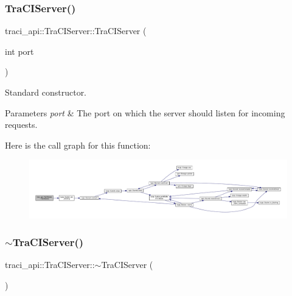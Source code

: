 \subsubsection{\texorpdfstring{Tra\+C\+I\+Server()}{TraCIServer()}}
{\footnotesize\ttfamily traci\+\_\+api\+::\+Tra\+C\+I\+Server\+::\+Tra\+C\+I\+Server (\begin{DoxyParamCaption}\item[{int}]{port }\end{DoxyParamCaption})}



Standard constructor. 


\begin{DoxyParams}{Parameters}
{\em port} & The port on which the server should listen for incoming requests. \\
\hline
\end{DoxyParams}
Here is the call graph for this function\+:\nopagebreak
\begin{figure}[H]
\begin{center}
\leavevmode
\includegraphics[width=350pt]{classtraci__api_1_1_tra_c_i_server_a9960233a10a2c3790c375f91eec00b12_cgraph}
\end{center}
\end{figure}
\mbox{\label{classtraci__api_1_1_tra_c_i_server_a8ddc7d9ea6812c937cdaa06a00026eba}} 
\subsubsection{\texorpdfstring{$\sim$\+Tra\+C\+I\+Server()}{~TraCIServer()}}
{\footnotesize\ttfamily traci\+\_\+api\+::\+Tra\+C\+I\+Server\+::$\sim$\+Tra\+C\+I\+Server (\begin{DoxyParamCaption}{ }\end{DoxyParamCaption})}



